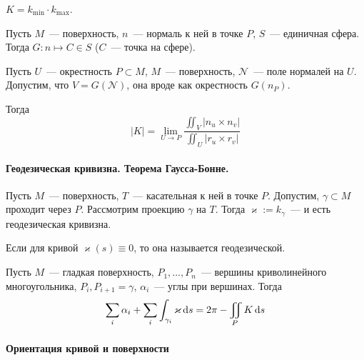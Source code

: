\documentclass[12pt,draft,timbord]{longnotes}
\begin{document}
\begin{defn}\label{defn:meas::gauss::crvf}
  $K = k_{\min} \cdot k_{\max}$.
\end{defn}

\begin{defn}\label{defn:meas::gauss::map}
  Пусть $M$~--- поверхность, $n$~--- нормаль к ней в точке $P$, $S$~--- единичная сфера.
  Тогда $G: n \mapsto C \in S$ ($C$~--- точка на сфере).
\end{defn}

\begin{thrm}\label{thrm:meas::gauss::lim}
  Пусть $U$~--- окрестность $P \subset M$, $M$~--- поверхность, $\mathcal N$~--- поле нормалей
  на $U$. Допустим, что $V = G(\mathcal N)$, она вроде как окрестность $G(n_P)$. 

  Тогда \[
    |K| = \lim_{U \to P} \frac{\iint_V |n_u \times n_v|}{\iint_U|r_u \times r_v|} 
  \]
\end{thrm}

\paragraph{Геодезическая кривизна. Теорема Гаусса-Бонне.}
\label{par:dg::bonnet}

\begin{defn}\label{defn:dg::bonnet::geodcrvn}
  Пусть $M$~--- поверхность, $T$~--- касательная к ней в точке $P$. Допустим,
  $\gamma \subset M$ проходит через $P$. Рассмотрим проекцию $\gamma$ на $T$.
  Тогда $\varkappa := k_\gamma $~--- и есть геодезическая кривизна.
\end{defn}

\begin{defn}\label{defn:dg::bonnet::geodcurv}
  Если для кривой $\varkappa(s) \equiv 0$, то она называется геодезической.
\end{defn}

\begin{thrm}\label{thrm:dg::bonnet}
  Пусть $M$~--- гладкая поверхность, $P_1, \dotsc, P_n$~--- вершины криволинейного многоугольника,
  $P_i, P_{i+1} = \gamma $, $\alpha_i$~--- углы при вершинах. Тогда \[
    \sum_i \alpha_i + \sum_i \int _{\gamma_i} \varkappa \, \mathrm{d} s  = 2 \pi - \iint_P K \, \mathrm{d} s
  \]
\end{thrm}





\paragraph{Ориентация кривой и поверхности}
\label{par:dg::orient}
\end{document}
